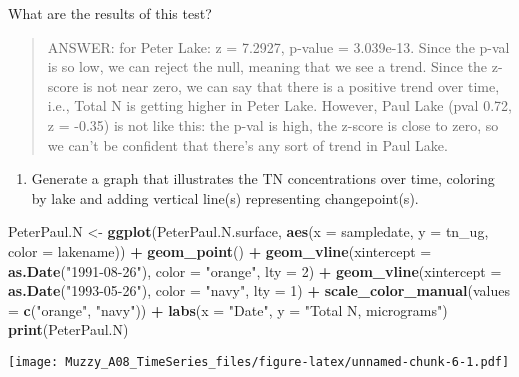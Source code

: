 \documentclass[]{article}
\newenvironment{Shaded}{\begin{snugshade}}{\end{snugshade}}
\newcommand{\KeywordTok}[1]{\textcolor[rgb]{0.13,0.29,0.53}{\textbf{#1}}}
\newcommand{\DataTypeTok}[1]{\textcolor[rgb]{0.13,0.29,0.53}{#1}}
\newcommand{\DecValTok}[1]{\textcolor[rgb]{0.00,0.00,0.81}{#1}}
\newcommand{\StringTok}[1]{\textcolor[rgb]{0.31,0.60,0.02}{#1}}
\newcommand{\OperatorTok}[1]{\textcolor[rgb]{0.81,0.36,0.00}{\textbf{#1}}}
\newcommand{\NormalTok}[1]{#1}
\providecommand{\tightlist}{%
  \setlength{\itemsep}{0pt}\setlength{\parskip}{0pt}}
\begin{document}
What are the results of this test?

\begin{quote}
ANSWER: for Peter Lake: z = 7.2927, p-value = 3.039e-13. Since the p-val
is so low, we can reject the null, meaning that we see a trend. Since
the z-score is not near zero, we can say that there is a positive trend
over time, i.e., Total N is getting higher in Peter Lake. However, Paul
Lake (pval 0.72, z = -0.35) is not like this: the p-val is high, the
z-score is close to zero, so we can't be confident that there's any sort
of trend in Paul Lake.
\end{quote}

\begin{enumerate}
\def\labelenumi{\arabic{enumi}.}
\setcounter{enumi}{4}
\tightlist
\item
  Generate a graph that illustrates the TN concentrations over time,
  coloring by lake and adding vertical line(s) representing
  changepoint(s).
\end{enumerate}

\begin{Shaded}
\begin{Highlighting}[]
\NormalTok{PeterPaul.N <-}\StringTok{ }\KeywordTok{ggplot}\NormalTok{(PeterPaul.N.surface, }\KeywordTok{aes}\NormalTok{(}\DataTypeTok{x =}\NormalTok{ sampledate, }\DataTypeTok{y =}\NormalTok{ tn_ug, }\DataTypeTok{color =}\NormalTok{ lakename)) }\OperatorTok{+}
\StringTok{  }\KeywordTok{geom_point}\NormalTok{() }\OperatorTok{+}
\StringTok{  }\KeywordTok{geom_vline}\NormalTok{(}\DataTypeTok{xintercept =} \KeywordTok{as.Date}\NormalTok{(}\StringTok{"1991-08-26"}\NormalTok{), }\DataTypeTok{color =} \StringTok{"orange"}\NormalTok{, }\DataTypeTok{lty =} \DecValTok{2}\NormalTok{) }\OperatorTok{+}
\StringTok{  }\KeywordTok{geom_vline}\NormalTok{(}\DataTypeTok{xintercept =} \KeywordTok{as.Date}\NormalTok{(}\StringTok{"1993-05-26"}\NormalTok{), }\DataTypeTok{color =} \StringTok{"navy"}\NormalTok{, }\DataTypeTok{lty =} \DecValTok{1}\NormalTok{) }\OperatorTok{+}
\StringTok{  }\KeywordTok{scale_color_manual}\NormalTok{(}\DataTypeTok{values =} \KeywordTok{c}\NormalTok{(}\StringTok{"orange"}\NormalTok{, }\StringTok{"navy"}\NormalTok{)) }\OperatorTok{+}
\StringTok{  }\KeywordTok{labs}\NormalTok{(}\DataTypeTok{x =} \StringTok{"Date"}\NormalTok{, }\DataTypeTok{y =} \StringTok{"Total N, micrograms"}\NormalTok{)}
\KeywordTok{print}\NormalTok{(PeterPaul.N)}
\end{Highlighting}
\end{Shaded}

\texttt{[image: Muzzy\_A08\_TimeSeries\_files/figure-latex/unnamed-chunk-6-1.pdf]}
\end{document}
